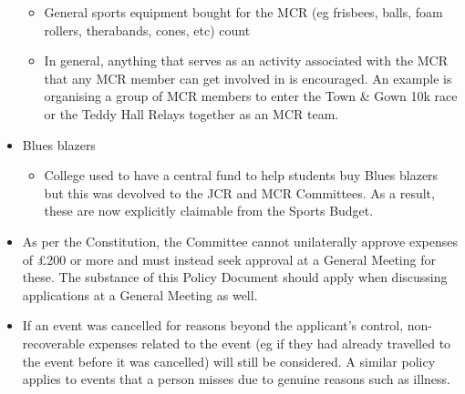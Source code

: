 \begin{itemize}
\begin{itemize}
		\item General sports equipment bought for the MCR (eg frisbees, balls, foam rollers, therabands, cones, etc) count
		\item In general, anything that serves as an activity associated with the MCR that any MCR member can get involved in is encouraged. An example is organising a group of MCR members to enter the Town \& Gown 10k race or the Teddy Hall Relays together as an MCR team.
	\end{itemize}
	\item Blues blazers
	\begin{itemize}
		\item College used to have a central fund to help students buy Blues blazers but this was devolved to the JCR and MCR Committees. As a result, these are now explicitly claimable from the Sports Budget.
	\end{itemize}
	\item As per the Constitution, the Committee cannot unilaterally approve expenses of \pounds 200 or more and must instead seek approval at a General Meeting for these. The substance of this Policy Document should apply when discussing applications at a General Meeting as well.
	\item If an event was cancelled for reasons beyond the applicant's control, non-recoverable expenses related to the event (eg if they had already travelled to the event before it was cancelled) will still be considered. A similar policy applies to events that a person misses due to genuine reasons such as illness.
\end{itemize}

